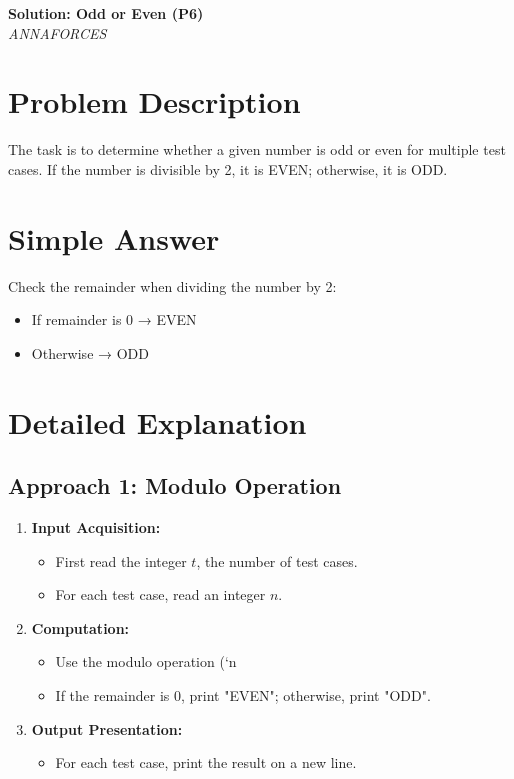 \documentclass[11pt,a4paper]{article}
\begin{document}
\begin{center}
  {\LARGE \bf Solution: Odd or Even (P6)}\\[6pt]
  {\large \it ANNAFORCES}\
  \vspace{6pt}
\end{center}

\section*{Problem Description}
The task is to determine whether a given number is odd or even for multiple test cases.
If the number is divisible by 2, it is EVEN; otherwise, it is ODD.

\section*{Simple Answer}
Check the remainder when dividing the number by 2:
\begin{itemize}
  \item If remainder is 0 → EVEN
  \item Otherwise → ODD
\end{itemize}

\section*{Detailed Explanation}
\subsection*{Approach 1: Modulo Operation}
\begin{enumerate}
  \item \textbf{Input Acquisition:}
    \begin{itemize}
      \item First read the integer $t$, the number of test cases.
      \item For each test case, read an integer $n$.
    \end{itemize}
  \item \textbf{Computation:}
    \begin{itemize}
      \item Use the modulo operation (`n %
      \item If the remainder is 0, print "EVEN"; otherwise, print "ODD".
    \end{itemize}
  \item \textbf{Output Presentation:}
    \begin{itemize}
      \item For each test case, print the result on a new line.
    \end{itemize}
\end{enumerate}
\end{document}
